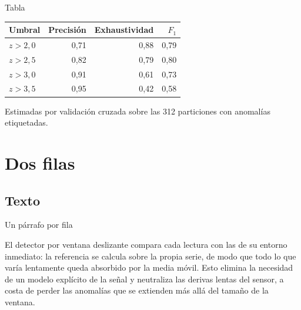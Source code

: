 \documentclass[aspectratio=169,9pt]{beamer}
\begin{document}
\begin{frame}{Tabla}

  \begin{tabular}{@{}lrrr@{}}
    \toprule
    Umbral        & Precisión & Exhaustividad & $F_1$ \\
    \midrule
    $z > 2{,}0$   & 0,71  & 0,88  & 0,79 \\
    $z > 2{,}5$   & 0,82  & 0,79  & 0,80 \\
    $z > 3{,}0$   & 0,91  & 0,61  & 0,73 \\
    $z > 3{,}5$   & 0,95  & 0,42  & 0,58 \\
    \bottomrule
  \end{tabular}

  Estimadas por validación cruzada sobre las 312 particiones con anomalías
  etiquetadas.
\end{frame}

\section{Dos filas}

\subsection{Texto}

\begin{frame}{Un párrafo por fila}
\begin{tworows}
  El detector por ventana deslizante compara cada lectura con las de su
  entorno inmediato: la referencia se calcula sobre la propia serie, de modo
  que todo lo que varía lentamente queda absorbido por la media móvil.
\nextrow
  Esto elimina la necesidad de un modelo explícito de la señal y neutraliza
  las derivas lentas del sensor, a costa de perder las anomalías que se
  extienden más allá del tamaño de la ventana.
\end{tworows}
\end{frame}
\end{document}

